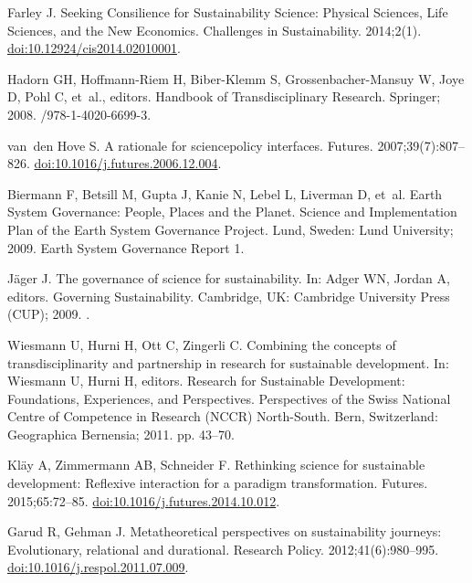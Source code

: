 \documentclass[10pt,a4paper]{article}
\begin{document}
\begin{multicols}{2}
\begin{footnotesize}
\begin{thebibliography}{10}
Farley J.
\newblock Seeking Consilience for Sustainability Science: Physical Sciences,
  Life Sciences, and the New Economics.
\newblock Challenges in Sustainability. 2014;2(1).
\newblock
  \href{https://doi.org/10.12924/cis2014.02010001}{doi:10.12924/cis2014.02010001}.

Hadorn GH, Hoffmann-Riem H, Biber-Klemm S, Grossenbacher-Mansuy W, Joye D, Pohl
  C, et~al., editors.
\newblock Handbook of Transdisciplinary Research.
\newblock Springer; 2008.
/978-1-4020-6699-3.

van~den Hove S.
\newblock A rationale for science{\textendash}policy interfaces.
\newblock Futures. 2007;39(7):807--826.
\newblock
  \href{https://doi.org/10.1016/j.futures.2006.12.004}{doi:10.1016/j.futures.2006.12.004}.

Biermann F, Betsill M, Gupta J, Kanie N, Lebel L, Liverman D, et~al.
\newblock Earth System Governance: People, Places and the Planet. Science and
  Implementation Plan of the Earth System Governance Project.
\newblock Lund, Sweden: Lund University; 2009. Earth System Governance Report
  1.

Jäger J.
\newblock The governance of science for sustainability.
\newblock In: Adger WN, Jordan A, editors. Governing Sustainability. Cambridge,
  UK: Cambridge University Press ({CUP}); 2009. .

Wiesmann U, Hurni H, Ott C, Zingerli C.
\newblock Combining the concepts of transdisciplinarity and partnership in
  research for sustainable development.
\newblock In: Wiesmann U, Hurni H, editors. Research for Sustainable
  Development: Foundations, Experiences, and Perspectives. Perspectives of the
  Swiss National Centre of Competence in Research (NCCR) North-South. Bern,
  Switzerland: Geographica Bernensia; 2011. pp. 43--70.

Kläy A, Zimmermann AB, Schneider F.
\newblock Rethinking science for sustainable development: Reflexive interaction
  for a paradigm transformation.
\newblock Futures. 2015;65:72--85.
\newblock
  \href{https://doi.org/10.1016/j.futures.2014.10.012}{doi:10.1016/j.futures.2014.10.012}.

Garud R, Gehman J.
\newblock Metatheoretical perspectives on sustainability journeys:
  Evolutionary, relational and durational.
\newblock Research Policy. 2012;41(6):980--995.
\newblock
  \href{https://doi.org/10.1016/j.respol.2011.07.009}{doi:10.1016/j.respol.2011.07.009}.


\end{thebibliography}
\end{footnotesize}
\end{multicols}
\end{document}
